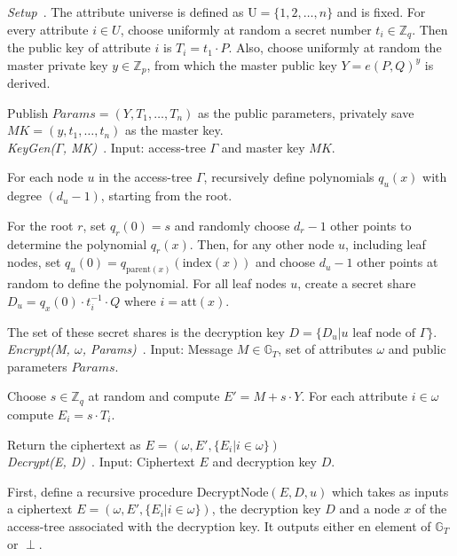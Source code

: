 \emph{Setup}~\cite{goyal_attribute-based_2006}.
The attribute universe is defined as $\text{U} = \{1, 2, \dots, n\}$ and is fixed.
For every attribute $i \in U$, choose uniformly at random a secret number $t_i \in \mathbb{Z}_q$.
Then the public key of attribute $i$ is $T_i = t_1 \cdot P$.
Also, choose uniformly at random the master private key $y \in \mathbb{Z}_p$, from which the master public key $Y = e(P, Q)^y$ is derived.

Publish $Params=(Y, T_1, \dots, T_n)$ as the public parameters, privately save $MK = (y, t_1, \dots, t_n)$ as the master key.
\\

\emph{KeyGen($\Gamma$, MK)}~\cite{goyal_attribute-based_2006}.
Input: \gls{access-tree} $\Gamma$ and master key $MK$.

For each node $u$ in the \gls{access-tree} $\Gamma$, recursively define polynomials $q_u(x)$ with degree $(d_u - 1)$, starting from the root.

For the root $r$, set $q_r(0) = s$ and randomly choose $d_r -1$ other points to determine the polynomial $q_r(x)$.
Then, for any other node $u$, including leaf nodes, set $q_u(0) = q_{\text{parent}(x)}(\text{index}(x))$ and choose $d_u -1$ other points at random to define the polynomial. 
For all leaf nodes $u$, create a secret share $D_u = q_x(0) \cdot t_i^{-1} \cdot Q$ where $i = \text{att}(x)$.

The set of these secret shares is the decryption key $D = \{D_u | u \text{ leaf node of } \Gamma\}$.\\

\emph{Encrypt(M, $\omega$, Params)}~\cite{goyal_attribute-based_2006}.
Input: Message $M \in \mathbb{G}_T$, set of \glspl{attribute} $\omega$ and public parameters $Params$. 

Choose $s \in \mathbb{Z}_q$ at random and compute $E' = M + s \cdot Y$.
For each attribute $i \in \omega$ compute $E_i = s \cdot T_i$.

Return the ciphertext as $E = (\omega, E', \{E_i | i \in \omega\})$
\\

\emph{Decrypt(E, D)}~\cite{goyal_attribute-based_2006}.
Input: Ciphertext $E$ and decryption key $D$.

First, define a recursive procedure $\text{DecryptNode}(E, D, u)$ which takes as inputs a ciphertext $E = (\omega, E', \{E_i | i \in \omega\})$, the decryption key $D$ and a node $x$ of the \gls{access-tree} associated with the decryption key.
It outputs either en element of $\mathbb{G}_T$ or $\perp$.

